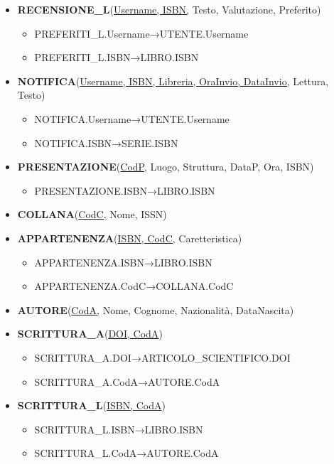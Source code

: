 \documentclass{article}
\begin{document}
\begin{itemize}
\begin{itemize}
        \end{itemize}
    \item \textbf{RECENSIONE\_L}(\underline{Username, ISBN,} Testo, Valutazione, Preferito)
        \begin{itemize} 
            \item PREFERITI\_L.Username→UTENTE.Username
            \item PREFERITI\_L.ISBN→LIBRO.ISBN
        \end{itemize}
    \item \textbf{NOTIFICA}(\underline{Username, ISBN, Libreria, OraInvio, DataInvio,} Lettura, Testo)
        \begin{itemize}        
            \item NOTIFICA.Username→UTENTE.Username
            \item NOTIFICA.ISBN→SERIE.ISBN
        \end{itemize}
    \item \textbf{PRESENTAZIONE}(\underline{CodP,} Luogo, Struttura, DataP, Ora, ISBN)
        \begin{itemize}        
            \item PRESENTAZIONE.ISBN→LIBRO.ISBN
        \end{itemize}
    \item \textbf{COLLANA}(\underline{CodC,} Nome, ISSN)
    \item \textbf{APPARTENENZA}(\underline{ISBN, CodC,} Caretteristica)
        \begin{itemize}        
            \item APPARTENENZA.ISBN→LIBRO.ISBN
            \item APPARTENENZA.CodC→COLLANA.CodC
        \end{itemize}
    \item \textbf{AUTORE}(\underline{CodA,} Nome, Cognome, Nazionalità, DataNascita)
    \item \textbf{SCRITTURA\_A}(\underline{DOI, CodA})
        \begin{itemize}        
            \item SCRITTURA\_A.DOI→ARTICOLO\_SCIENTIFICO.DOI
            \item SCRITTURA\_A.CodA→AUTORE.CodA
        \end{itemize}
    \item \textbf{SCRITTURA\_L}(\underline{ISBN, CodA})
        \begin{itemize}
            \item SCRITTURA\_L.ISBN→LIBRO.ISBN
            \item SCRITTURA\_L.CodA→AUTORE.CodA
        \end{itemize}
\end{itemize}
\end{document}
